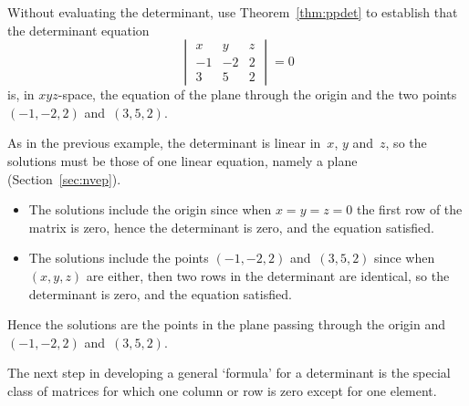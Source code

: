\begin{example} \label{eg:planeq}
Without evaluating the determinant, use Theorem~\ref{thm:ppdet} to establish that the determinant equation
\begin{equation*}
\begin{vmatrix} x&y&z\\-1&-2&2\\3&5&2 \end{vmatrix}=0
\end{equation*}
is, in \(xyz\)-space, the equation of the plane through the origin and the two points \((-1,-2,2)\) and~\((3,5,2)\).
\begin{solution} 
As in the previous example, the determinant is linear in~\(x\), \(y\) and~\(z\), so the solutions must be those of one linear equation, namely a plane (Section~\ref{sec:nvep}).
\begin{itemize}
\item The solutions include the origin since when \(x=y=z=0\) the first row of the matrix is zero, hence the determinant is zero, and the equation satisfied.
\item The solutions include the  points \((-1,-2,2)\) and~\((3,5,2)\) since when \((x,y,z)\) are either, then two rows in the determinant are identical, so the determinant is zero, and the equation satisfied.
\end{itemize}
Hence the solutions are the points in the plane passing through the origin and \((-1,-2,2)\) and~\((3,5,2)\).
\end{solution}
\end{example}






The next step in developing a general `formula' for a determinant is the special class of matrices for which one column or row is zero except for one element.



